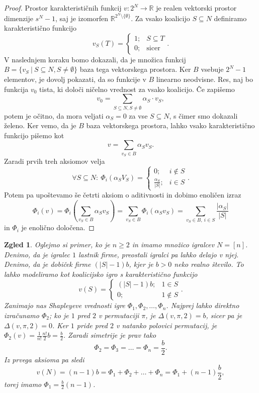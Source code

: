 \documentclass[10pt, a4paper]{article}
\newtheorem{zgled}[izr]{Zgled}
\newenvironment{noticeC}{%
  \tcolorbox[%
  notitle,
  empty,
  enhanced,  %
  breakable,
  coltext=black, 
  fontupper=\rmfamily,
  noparskip,
  sharp corners,
  boxrule=-1pt,  %
  frame hidden,
  left=7pt,  %
  right=7pt,
  top=5pt,
  bottom=5pt,
  before skip=2.5ex plus 2pt,
  after skip=2.5ex plus 2pt,
  overlay unbroken and last={%
  },
  ]}
{\endtcolorbox}
\newenvironment{dokaz}%
  {\begin{noticeC}\begin{proof}}%
  {\end{proof}\end{noticeC}}
\newcommand{\R}{\mathbb {R}}
\begin{document}
\begin{dokaz}
  Prostor karakterističnih funkcij $v: 2^N \to \R$ je realen vektorski prostor dimenzije $s^N - 1$,
  saj je izomorfen $\R^{2^N \setminus \{\emptyset\}}$.
  Za vsako koalicijo $S \subseteq N$ definiramo karakteristično funkcijo
  $$v_S (T) = \begin{cases}
    1;& S \subseteq T\\
    0;& \text{sicer}
  \end{cases}.$$
  V naslednjem koraku bomo dokazali, da je množica funkcij 
  $B = \{v_S\ |\ S \subseteq N, S \neq \emptyset\}$ baza tega vektorskega prostora.
  Ker $B$ vsebuje $2^N - 1$ elementov, je dovolj pokazati, da so funkcije v $B$ linearno neodvisne.
  Res, naj bo funkcija $v_0$ tista, ki določi ničelno vrednost za vsako koalicijo.
  Če zapišemo 
  $$v_0 = \sum_{S \subseteq N, S \neq \emptyset} \alpha_S \cdot v_S,$$
  potem je očitno, da mora veljati $\alpha_S = 0$ za vse $S \subseteq N$,
  s čimer smo dokazali želeno. Ker vemo, da je $B$ baza vektorskega prostora,
  lahko vsako karakteristično funkcijo pišemo kot 
  $$v = \sum_{v_S \in B} \alpha_S v_S.$$
  Zaradi prvih treh aksiomov velja 
  $$\forall S \subseteq N:\ \Phi_i (\alpha_S V_S) = \begin{cases}
    0;& i \notin S\\
    \frac{\alpha_S}{|S|};& i \in S
  \end{cases}.$$
  Potem pa upoštevamo še četrti aksiom o aditivnosti in dobimo enoličen izraz 
  $$\Phi_i (v) = \Phi_i \left(\sum_{v_S \in B} \alpha_S v_S\right) = \sum_{v_S \in B} \Phi_i (\alpha_S v_S) = \sum_{v_S \in B,\ i \in S} \frac{|\alpha_S|}{|S|}$$
  in $\Phi_i$ je enolično določena.
\end{dokaz}

\begin{zgled}
  Oglejmo si primer, ko je $n \geq 2$ in imamo množico igralcev $N = [n]$.
  Denimo, da je igralec $1$ lastnik firme, preostali igralci pa lahko delajo v njej.
  Denimo, da je dobiček firme $(|S| - 1)b$, kjer je $b > 0$ neko realno število.
  To lahko modeliramo kot koalicijsko igro s karakteristično funkcijo 
  $$v(S) = \begin{cases}
    (|S| - 1)b;& 1 \in S\\
    0;& 1 \notin S
  \end{cases}.$$
  Zanimajo nas Shapleyeve vrednosti igre $\Phi_1, \Phi_2, \dots, \Phi_n$.
  Najprej lahko direktno izračunamo $\Phi_2$; ko je $1$ pred $2$ v permutaciji $\pi$, je $\Delta(v, \pi, 2) = b$,
  sicer pa je $\Delta(v, \pi, 2) = 0$.
  Ker $1$ pride pred $2$ v natanko polovici permutacij, je $\Phi_2 (v) = \frac{1}{n!} \frac{n!}{2} b = \frac{b}{2}$.
  Zaradi simetrije je prav tako 
  $$\Phi_2 = \Phi_3 = \dots = \Phi_n = \frac{b}{2}.$$
  Iz prvega aksioma pa sledi
  $$v(N) = (n - 1)b = \Phi_1 + \Phi_2 + \dots + \Phi_n = \Phi_1 + (n - 1)\frac{b}{2},$$
  torej imamo $\Phi_1 = \frac{b}{2} (n - 1)$.
\end{zgled}
\end{document}
